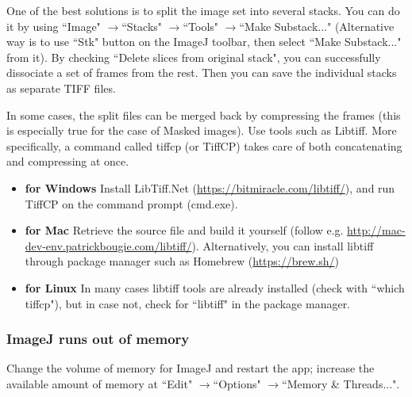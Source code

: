 \documentclass[a4paper,oneside,10pt]{article}
\newcommand{\submenu}{\begin{math}\rightarrow\end{math}}
\begin{document}
One of the best solutions is to split the image set into several stacks. You can do it by using ``Image" \submenu ``Stacks" \submenu ``Tools" \submenu ``Make Substack..." (Alternative way is to use ``Stk" button on the ImageJ toolbar, then select ``Make Substack..." from it). By checking ``Delete slices from original stack", you can successfully dissociate a set of frames from the rest. Then you can save the individual stacks as separate TIFF files.

In some cases, the split files can be merged back by compressing the frames (this is especially true for the case of Masked images). Use tools such as Libtiff. More specifically, a command called tiffcp (or TiffCP) takes care of both concatenating and compressing at once.

\begin{itemize}
\item {\bf for Windows} Install LibTiff.Net (\url{https://bitmiracle.com/libtiff/}), and run TiffCP on the command prompt (cmd.exe).
\item {\bf for Mac} Retrieve the source file and build it yourself (follow e.g. \url{http://mac-dev-env.patrickbougie.com/libtiff/}). Alternatively, you can install libtiff through package manager such as Homebrew (\url{https://brew.sh/}) 
\item {\bf for Linux} In many cases libtiff tools are already installed (check with ``which tiffcp"), but in case not, check for ``libtiff" in the package manager.
\end{itemize}

\subsubsection{ImageJ runs out of memory}
Change the volume of memory for ImageJ and restart the app; increase the available amount of memory at ``Edit" \submenu ``Options" \submenu ``Memory \& Threads...".
\end{document}
